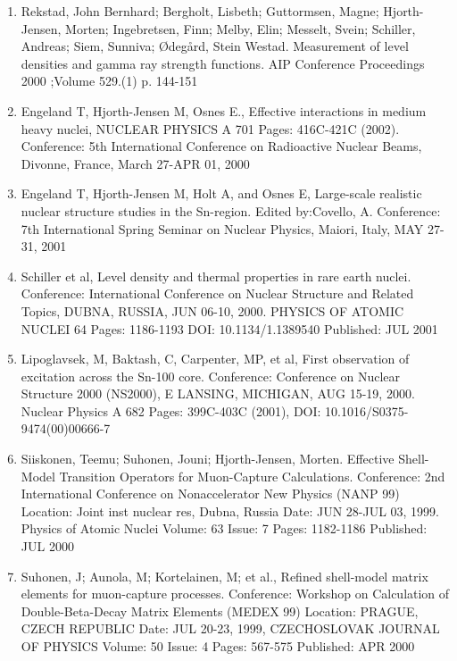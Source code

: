 \documentclass[%
oneside,                 %
final,                   %
10pt]{article}
\begin{document}
\begin{enumerate}
\item Rekstad, John Bernhard; Bergholt, Lisbeth; Guttormsen, Magne; Hjorth-Jensen, Morten; Ingebretsen, Finn; Melby, Elin; Messelt, Svein; Schiller, Andreas; Siem, Sunniva; Ødegård, Stein Westad. Measurement of level densities and gamma ray strength functions. AIP Conference Proceedings 2000 ;Volume 529.(1) p. 144-151

\item Engeland T, Hjorth-Jensen M, Osnes E., Effective interactions in medium heavy nuclei, NUCLEAR PHYSICS A 701  Pages: 416C-421C (2002). Conference: 5th International Conference on Radioactive Nuclear Beams, Divonne, France, March 27-APR 01, 2000

\item Engeland T, Hjorth-Jensen M, Holt A, and Osnes E,   Large-scale realistic nuclear structure studies in the Sn-region. Edited by:Covello, A. Conference: 7th International Spring Seminar on Nuclear Physics, Maiori, Italy, MAY 27-31, 2001

\item Schiller et al,  Level density and thermal properties in rare earth nuclei. Conference: International Conference on Nuclear Structure and Related Topics, DUBNA, RUSSIA, JUN 06-10, 2000. PHYSICS OF ATOMIC NUCLEI 64  Pages: 1186-1193 DOI: 10.1134/1.1389540 Published: JUL 2001

\item Lipoglavsek, M, Baktash, C, Carpenter, MP,  et al, First observation of excitation across the Sn-100 core. Conference: Conference on Nuclear Structure 2000 (NS2000), E LANSING, MICHIGAN, AUG 15-19, 2000. Nuclear Physics A 682  Pages: 399C-403C (2001), DOI: 10.1016/S0375-9474(00)00666-7

\item Siiskonen, Teemu; Suhonen, Jouni; Hjorth-Jensen, Morten.  Effective Shell-Model Transition Operators for Muon-Capture Calculations.  Conference: 2nd International Conference on Nonaccelerator New Physics (NANP 99) Location: Joint inst nuclear res, Dubna, Russia Date: JUN 28-JUL 03, 1999. Physics of Atomic Nuclei  Volume: 63   Issue: 7   Pages: 1182-1186   Published: JUL 2000

\item Suhonen, J; Aunola, M; Kortelainen, M; et al., Refined shell-model matrix elements for muon-capture processes. Conference: Workshop on Calculation of Double-Beta-Decay Matrix Elements (MEDEX 99) Location: PRAGUE, CZECH REPUBLIC Date: JUL 20-23, 1999, CZECHOSLOVAK JOURNAL OF PHYSICS  Volume: 50   Issue: 4   Pages: 567-575   Published: APR 2000


\end{enumerate}
\end{document}
